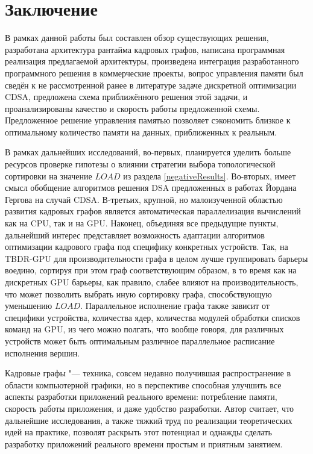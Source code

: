 \section{Заключение}
В рамках данной работы был составлен обзор существующих решения, разработана архитектура рантайма кадровых графов, написана программная реализация предлагаемой архитектуры, произведена интеграция разработанного программного решения в коммерческие проекты, вопрос управления памяти был сведён к не рассмотренной ранее в литературе задаче дискретной оптимизации CDSA, предложена схема приближённого решения этой задачи, и проанализированы качество и скорость работы предложенной схемы.
Предложенное решение управления памятью позволяет сэкономить близкое к оптимальному количество памяти на данных, приближенных к реальным.

В рамках дальнейших исследований, во-первых, планируется уделить больше ресурсов проверке гипотезы о влиянии стратегии выбора топологической сортировки на значение $LOAD$ из раздела \ref{negativeResults}.
Во-вторых, имеет смысл обобщение алгоритмов решения DSA предложенных в работах Йордана Гергова \cite{gergov_approximation_1996, gergov_algorithms_1999} на случай CDSA.
В-третьих, крупной, но малоизученной областью развития кадровых графов является автоматическая параллелизация вычислений как на CPU, так и на GPU.
Наконец, объединяя все предыдущие пункты, дальнейший интерес представляет возможность адаптации алгоритмов оптимизации кадрового графа под специфику конкретных устройств. Так, на TBDR-GPU для производительности графа в целом лучше группировать барьеры воедино, сортируя при этом граф соответствующим образом, в то время как на дискретных GPU барьеры, как правило, слабее влияют на производительность, что может позволить выбрать иную сортировку графа, способствующую уменьшению $LOAD$. Параллельное исполнение графа также зависит от специфики устройства, количества ядер, количества модулей обработки списков команд на GPU, из чего можно полгать, что вообще говоря, для различных устройств может быть оптимальным различное параллельное расписание исполнения вершин.

Кадровые графы "--- техника, совсем недавно получившая распространение в области компьютерной графики, но в перспективе способная улучшить все аспекты разработки приложений реального времени: потребление памяти, скорость работы приложения, и даже удобство разработки. Автор считает, что дальнейшие исследования, а также тяжкий труд по реализации теоретических идей на практике, позволят раскрыть этот потенциал и однажды сделать разработку приложений реального времени простым и приятным занятием.
